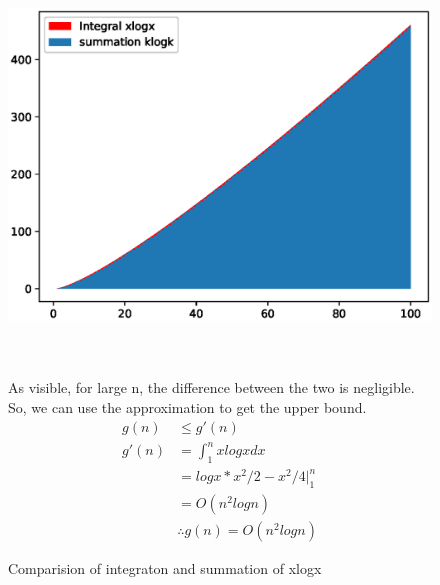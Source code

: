 \documentclass[a4paper,12pt]{report}
\begin{document}
\begin{enumerate}
\begin{enumerate}
\begin{figure}
\includegraphics[scale=0.8]{large.eps}
\caption*{Comparision of integraton and summation of xlogx}~\\\\
As visible, for large n, the difference between the two is negligible. So, we can use the approximation to get the upper bound.
\begin{align*}
g(n) &\leqslant g'(n)\\
g'(n) &= \int_{1}^{n} xlogx dx\\
&= logx*x^2/2 - x^2/4 \Big|_1^n\\
&= O(n^2logn)\\
&\therefore g(n) =  O(n^2logn)
\end{align*}
\end{figure}
\end{enumerate}
\end{enumerate}
\end{document}
